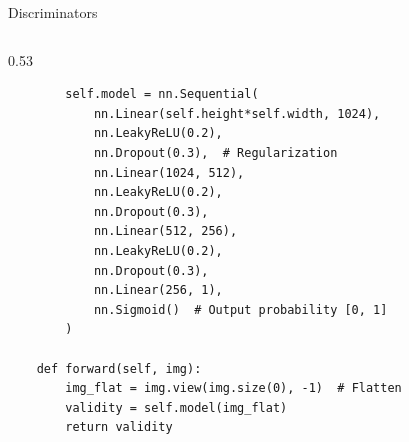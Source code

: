 \documentclass[aspectratio=169,xcolor=dvipsnames,svgnames,x11names,fleqn]{beamer}
\begin{document}
\begin{frame}[fragile]{Discriminators}
\begin{columns}[T]
\begin{column}{0.53\textwidth}
\begin{tcolorbox}[enhanced, boxrule=0.5pt, colback=pink!5, colframe=pink!50!black, title=PyTorch Implementation, fonttitle=\bfseries\small]
\begin{verbatim}
        self.model = nn.Sequential(
            nn.Linear(self.height*self.width, 1024),
            nn.LeakyReLU(0.2),
            nn.Dropout(0.3),  # Regularization
            nn.Linear(1024, 512),
            nn.LeakyReLU(0.2),
            nn.Dropout(0.3),
            nn.Linear(512, 256),
            nn.LeakyReLU(0.2),
            nn.Dropout(0.3),
            nn.Linear(256, 1),
            nn.Sigmoid()  # Output probability [0, 1]
        )
    
    def forward(self, img):
        img_flat = img.view(img.size(0), -1)  # Flatten
        validity = self.model(img_flat)
        return validity
                \end{verbatim}
            \end{tcolorbox}
        \end{column}
    \end{columns}
\end{frame}
\end{document}
